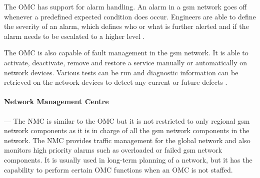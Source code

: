 The \gls{OMC} has support for alarm handling\cite{GSMSysEngin}. An alarm in a \gls{gsm} network goes off whenever a predefined expected condition does occur. Engineers are able to define the severity of an alarm, which defines who or what is further alerted and if the alarm needs to be escalated to a higher level \cite{GSMSysEngin}.

The \gls{OMC} is also capable of fault management in the \gls{gsm} network\cite{GSMSysEngin}. It is able to activate, deactivate, remove and restore a service manually or automatically on network devices\cite{GSM92}. Various tests can be run and diagnostic information can be retrieved on the network devices to detect any current or future defects \cite{GSMSysEngin}.

\paragraph{Network Management Centre}
--- The \gls{NMC} is similar to the \gls{OMC} but it is not restricted to only regional \gls{gsm} network components as it is in charge of all the \gls{gsm} network components in the network\cite{GSMSysEngin}. The \gls{NMC} provides traffic management for the global network and also monitors high priority alarms such as overloaded or failed \gls{gsm} network components\cite{GSMSysEngin}. It is usually used in long-term planning of a network, but it has the capability to perform certain \gls{OMC} functions when an \gls{OMC} is not staffed. 

